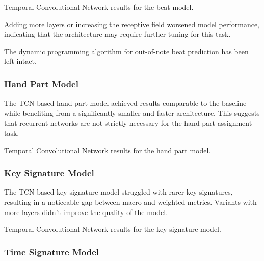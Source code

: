 \begin{table}[ht!]
\centering

\caption[Temporal Convolutional Network results for the beat model.]{Temporal Convolutional Network results for the beat model.}
\label{beat_tcn}
\end{table}

Adding more layers or increasing the receptive field worsened model performance, indicating that the architecture may require further tuning for this task. 

The dynamic programming algorithm for out-of-note beat prediction has been left intact.

\subsubsection{Hand Part Model}

The TCN-based hand part model achieved results comparable to the baseline while benefiting from a significantly smaller and faster architecture. This suggests that recurrent networks are not strictly necessary for the hand part assignment task.

\begin{table}[ht!]
\centering

\caption[Temporal Convolutional Network results for the hand part model.]{Temporal Convolutional Network results for the hand part model.}
\label{hand_part_tcn}
\end{table}

\subsubsection{Key Signature Model}

The TCN-based key signature model struggled with rarer key signatures, resulting in a noticeable gap between macro and weighted metrics. Variants with more layers didn't improve the quality of the model.

\begin{table}[ht!]
\centering

\caption[Temporal Convolutional Network results for the key signature model.]{Temporal Convolutional Network results for the key signature model.}
\label{key_signature_tcn}
\end{table}

\subsubsection{Time Signature Model}

